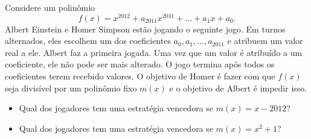 Considere um polinômio
\[f(x)=x^{2012}+a_{2011}x^{2011}+\dots+a_1x+a_0.\]
Albert Einstein e Homer Simpson estão jogando o seguinte jogo. Em turnos alternados, eles escolhem um dos coeficientes \(a_0,a_1,\dots,a_{2011}\) e atribuem um valor real a ele. Albert faz a primeira jogada. Uma vez que um valor é atribuído a um coeficiente, ele não pode ser mais alterado. O jogo termina após todos os coeficientes terem recebido valores.
O objetivo de Homer é fazer com que \(f(x)\) seja divisível por um polinômio fixo \(m(x)\) e o objetivo de Albert é impedir isso.
\begin{itemize}

\item[(a)] Qual dos jogadores tem uma estratégia vencedora se \(m(x)=x-2012\)?
\item[(b)] Qual dos jogadores tem uma estratégia vencedora se \(m(x)=x^2+1\)?
\end{itemize}
